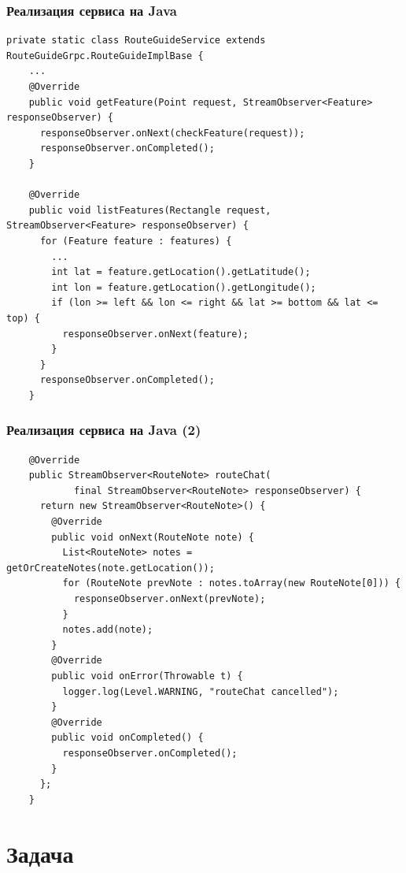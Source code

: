 \documentclass[xetex,mathserif,serif]{beamer}
\begin{document}
	\begin{frame}[fragile]
		\frametitle{Реализация сервиса на Java}
		\begin{scriptsize}
			\begin{verbatim}
private static class RouteGuideService extends RouteGuideGrpc.RouteGuideImplBase {
    ...
    @Override
    public void getFeature(Point request, StreamObserver<Feature> responseObserver) {
      responseObserver.onNext(checkFeature(request));
      responseObserver.onCompleted();
    }

    @Override
    public void listFeatures(Rectangle request, StreamObserver<Feature> responseObserver) {
      for (Feature feature : features) {
        ...
        int lat = feature.getLocation().getLatitude();
        int lon = feature.getLocation().getLongitude();
        if (lon >= left && lon <= right && lat >= bottom && lat <= top) {
          responseObserver.onNext(feature);
        }
      }
      responseObserver.onCompleted();
    }
			\end{verbatim}
		\end{scriptsize}
\end{frame}

	\begin{frame}[fragile]
		\frametitle{Реализация сервиса на Java (2)}
		\begin{scriptsize}
			\begin{verbatim}
    @Override
    public StreamObserver<RouteNote> routeChat(
            final StreamObserver<RouteNote> responseObserver) {
      return new StreamObserver<RouteNote>() {
        @Override
        public void onNext(RouteNote note) {
          List<RouteNote> notes = getOrCreateNotes(note.getLocation());
          for (RouteNote prevNote : notes.toArray(new RouteNote[0])) {
            responseObserver.onNext(prevNote);
          }
          notes.add(note);
        }
        @Override
        public void onError(Throwable t) {
          logger.log(Level.WARNING, "routeChat cancelled");
        }
        @Override
        public void onCompleted() {
          responseObserver.onCompleted();
        }
      };
    }
			\end{verbatim}
		\end{scriptsize}
\end{frame}

	\section{Задача}
\end{document}
